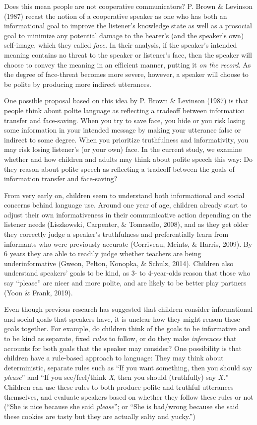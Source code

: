 \documentclass[oneside]{report}
\begin{document}
Does this mean people are not cooperative communicators? P. Brown \&
Levinson (1987) recast the notion of a cooperative speaker as one who
has both an informational goal to improve the listener's knowledge state
as well as a prosocial goal to minimize any potential damage to the
hearer's (and the speaker's own) self-image, which they called
\emph{face.} In their analysis, if the speaker's intended meaning
contains no threat to the speaker or listener's face, then the speaker
will choose to convey the meaning in an efficient manner, putting it
\emph{on the record}. As the degree of face-threat becomes more severe,
however, a speaker will choose to be polite by producing more indirect
utterances.

One possible proposal based on this idea by P. Brown \& Levinson (1987)
is that people think about polite language as reflecting a tradeoff
between information transfer and face-saving. When you try to save face,
you hide or you risk losing some information in your intended message by
making your utterance false or indirect to some degree. When you
prioritize truthfulness and informativity, you may risk losing
listener's (or your own) face. In the current study, we examine whether
and how children and adults may think about polite speech this way: Do
they reason about polite speech as reflecting a tradeoff between the
goals of information transfer and face-saving?

From very early on, children seem to understand both informational and
social concerns behind language use. Around one year of age, children
already start to adjust their own informativeness in their communicative
action depending on the listener needs (Liszkowski, Carpenter, \&
Tomasello, 2008), and as they get older they correctly judge a speaker's
truthfulness and preferentially learn from informants who were
previously accurate (Corriveau, Meints, \& Harris, 2009). By 6 years
they are able to readily judge whether teachers are being
underinformative (Gweon, Pelton, Konopka, \& Schulz, 2014). Children
also understand speakers' goals to be kind, as 3- to 4-year-olds reason
that those who say ``please'' are nicer and more polite, and are likely
to be better play partners (Yoon \& Frank, 2019).

Even though previous research has suggested that children consider
informational and social goals that speakers have, it is unclear how
they might reason these goals together. For example, do children think
of the goals to be informative and to be kind as separate, fixed
\emph{rules} to follow, or do they make \emph{inferences} that accounts
for both goals that the speaker may consider? One possibility is that
children have a rule-based approach to language: They may think about
deterministic, separate rules such as ``If you want something, then you
should say \emph{please}'' and ``If you see/feel/think \emph{X}, then
you should (truthfully) say \emph{X.}'' Children can use these rules to
both produce polite and truthful utterances themselves, and evaluate
speakers based on whether they follow these rules or not (``She is nice
because she said \emph{please}''; or ``She is bad/wrong because she said
these cookies are tasty but they are actually salty and yucky.'')
\end{document}
